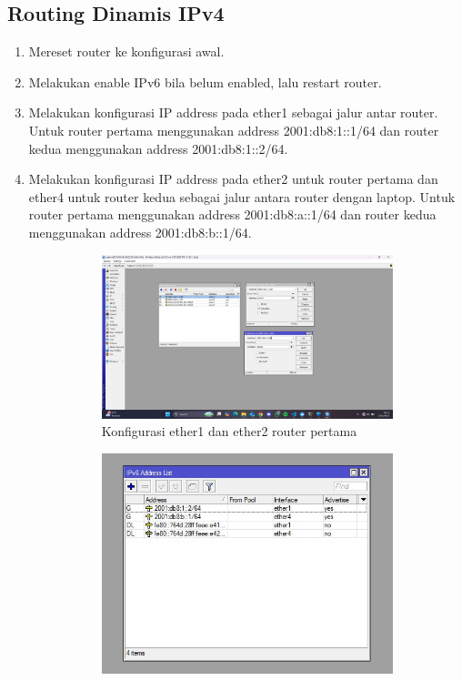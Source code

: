 \subsection{Routing Dinamis IPv4}
\begin{enumerate}
	\item Mereset router ke konfigurasi awal.
	\item Melakukan enable IPv6 bila belum enabled, lalu restart router.
	\item Melakukan konfigurasi IP address pada ether1 sebagai jalur antar router. Untuk router pertama menggunakan address 2001:db8:1::1/64 dan router kedua menggunakan address 2001:db8:1::2/64.
	\item Melakukan konfigurasi IP address pada ether2 untuk router pertama dan ether4 untuk router kedua sebagai jalur antara router dengan laptop. Untuk router pertama menggunakan address 2001:db8:a::1/64 dan router kedua menggunakan address 2001:db8:b::1/64.
	\begin{figure}[H]
		\centering
		\begin{subfigure}[b]{0.4\linewidth}
			\centering
			\includegraphics[width=\linewidth]{P2/img/router 1 laptop 1 (4).jpg}
			\caption{Konfigurasi ether1 dan ether2 router pertama\label{fig:konfigurasiR1}}
		\end{subfigure}
		\begin{subfigure}[b]{0.4\linewidth}
			\centering
			\includegraphics[width=\linewidth]{P2/img/router2 laptop2 (1).jpg}

\end{subfigure}
\end{figure}
\end{enumerate}
